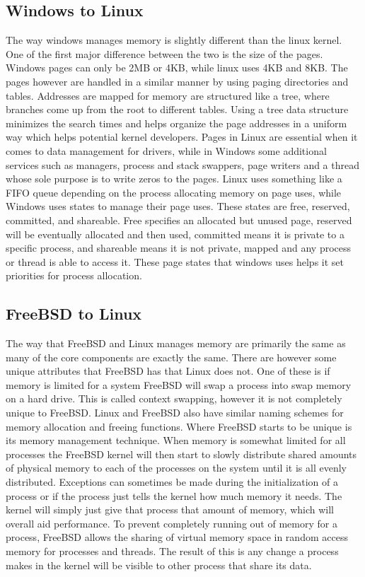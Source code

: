 \documentclass[onecolumn, draftclsnofoot, 10pt, titlepage, compsoc]{IEEEtran}
\begin{document}
\subsection{Windows to Linux}
The way windows manages memory is slightly different than the linux kernel. One of the first major difference between the two is the size of the pages.  Windows pages can only be 2MB or 4KB, while linux uses 4KB and 8KB. The pages however are handled in a similar manner by using paging directories and tables. Addresses are mapped for memory are structured like a tree, where branches come up from the root to different tables. Using a tree data structure minimizes the search times and helps organize the page addresses in a uniform way which helps potential kernel developers.  Pages in Linux are essential when it comes to data management for drivers, while in Windows some additional services such as managers, process and stack swappers, page writers and a thread whose sole purpose is to write zeros to the pages. Linux uses something like a FIFO queue depending on the process allocating memory on page uses, while Windows uses states to manage their page uses. These states are free, reserved, committed, and shareable. Free specifies an allocated but unused page, reserved will be eventually allocated and then used, committed means it is private to a specific process, and shareable means it is not private, mapped and any process or thread is able to access it. These page states that windows uses helps it set priorities for process allocation.

\subsection{FreeBSD to Linux}
The way that FreeBSD and Linux manages memory are primarily the same as many of the core components are exactly the same. There are however some unique attributes that FreeBSD has that Linux does not. One of these is if memory is limited for a system FreeBSD will swap a process into swap memory on a hard drive. This is called context swapping, however it is not completely unique to FreeBSD. Linux and FreeBSD also have similar naming schemes for memory allocation and freeing functions. Where FreeBSD starts to be unique is its memory management technique. When memory is somewhat limited for all processes the FreeBSD kernel will then start to slowly distribute shared amounts of physical memory to each of the processes on the system until it is all evenly distributed. Exceptions can sometimes be made during the initialization of a process or if the process just tells the kernel how much memory it needs. The kernel will simply just give that process that amount of memory, which will overall aid performance. To prevent completely running out of memory for a process, FreeBSD allows the sharing of virtual memory space in random access memory for processes and threads. The result of this is any change a process makes in the kernel will be visible to other process that share its data.
\end{document}
